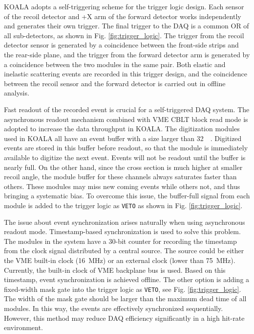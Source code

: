 \documentclass[number,5p]{elsarticle}
\begin{document}
KOALA adopts a self-triggering scheme for the trigger logic design.
Each sensor of the recoil detector and +X arm of the forward detector works independently and generates their own trigger. 
The final trigger to the DAQ is a common OR of all sub-detectors, as shown in Fig. \ref{fig:trigger_logic}.
The trigger from the recoil detector sensor is generated by a coincidence between the front-side strips and the rear-side plane, 
and the trigger from the forward detector arm is generated by a coincidence between the two modules in the same pair.
Both elastic and inelastic scattering events are recorded in this trigger design, and the coincidence between the recoil sensor and the forward detector is carried out in offline analysis.

Fast readout of the recorded event is crucial for a self-triggered DAQ system.
The asynchronous readout mechanism combined with VME CBLT block read mode is adopted to increase the data throughput in KOALA.
The digitization modules used in KOALA all have an event buffer with a size
larger than \SI{32}{\kilo\byte}.
Digitized events are stored in this buffer before readout, so that the module is immediately available to digitize the next event.
Events will not be readout until the buffer is nearly full.
On the other hand, since the cross section is much higher at smaller recoil
angle, the module buffer for these channels always saturates faster than others.
These modules may miss new coming events while others not, and thus bringing a systematic bias.
To overcome this issue, the buffer-full signal from each module is added to the trigger logic as \texttt{VETO} as shown in Fig. \ref{fig:trigger_logic}.

The issue about event synchronization arises naturally when using asynchronous
readout mode.
Timestamp-based synchronization is used to solve this problem.
The modules in the system have a 30-bit counter for recording the timestamp from
the clock signal distributed by a central source.
The source could be either the VME built-in clock (\SI{16}{\MHz}) or an external clock
(lower than \SI{75}{\MHz}).
Currently, the built-in clock of VME backplane bus is used. 
Based on this timestamp, event synchronization is achieved offline.
The other option is adding a fixed-width mask gate into the trigger logic as \texttt{VETO}, see Fig. \ref{fig:trigger_logic}.
The width of the mask gate should be larger than the maximum dead time of all modules.
In this way, the events are effectively synchronized sequentially. 
However, this method may reduce DAQ efficiency significantly in a high hit-rate environment.
\end{document}
